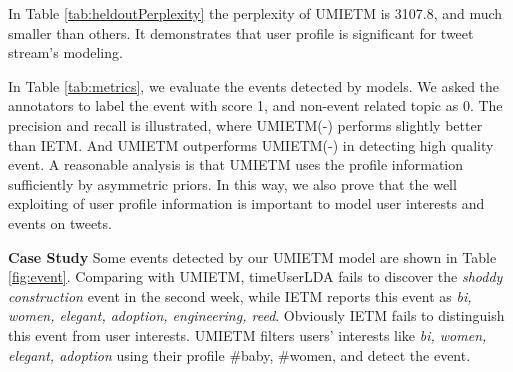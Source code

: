 \documentclass[runningheads,a4paper]{llncs}
\begin{document}
In Table \ref{tab:heldoutPerplexity} the perplexity of UMIETM is 3107.8, and much smaller than others. It demonstrates that user profile is significant for tweet stream's modeling.

In Table \ref{tab:metrics}, we evaluate the events detected by models. We asked the annotators to label the event with score 1, and non-event related topic as 0. 
The precision and recall is illustrated, where UMIETM(-) performs slightly better than IETM. 
And UMIETM outperforms UMIETM(-) in detecting high quality event. 
A reasonable analysis is that UMIETM uses the profile information sufficiently by asymmetric priors\cite{wallach2009rethinking}. 
In this way, we also prove that the well exploiting of user profile information is important to model user interests and events on tweets. 

\textbf{Case Study} 
Some events detected by our UMIETM model are shown in Table \ref{fig:event}.
Comparing with UMIETM, timeUserLDA fails to discover the \textit{shoddy construction} event in the second week, while IETM reports this event as \textit{bi, women, elegant, adoption, engineering, reed}. Obviously IETM fails to distinguish this event from user interests.
UMIETM filters users' interests like \textit{bi, women, elegant, adoption} using their profile {\#baby, \#women}, and detect the event.
\end{document}
